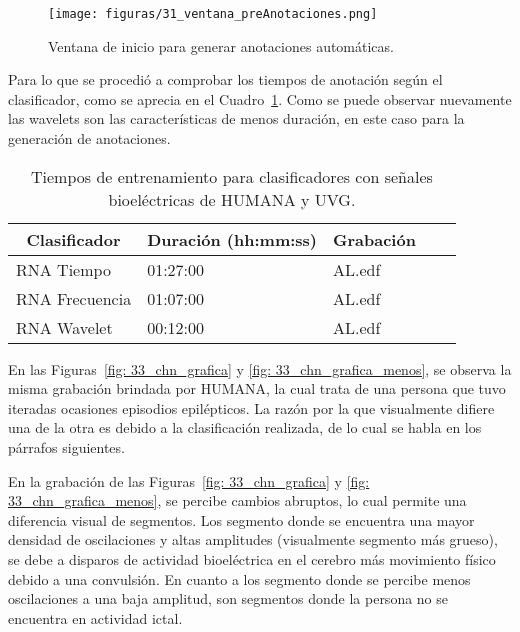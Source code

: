 \begin{figure}[H]
    \centering
    \texttt{[image: figuras/31\_ventana\_preAnotaciones.png]}
    \caption{Ventana de inicio para generar anotaciones automáticas.}
    \label{fig: pre_anotaciones_ventana}
\end{figure}

Para lo que se procedió a comprobar los tiempos de anotación según el clasificador, como se aprecia en el Cuadro~\ref{cuadro:Duracion anotaciones}. Como se puede observar nuevamente las wavelets son las características de menos duración, en este caso para la generación de anotaciones. 

\begin{table}[H]
\begin{center}
\begin{tabular}{|l|l|l|l|l|}
\hline
    \multicolumn{1}{|c|}{\textbf{Clasificador}} & \multicolumn{1}{c|}{\textbf{Duración (hh:mm:ss)}} & \multicolumn{1}{c|}{\textbf{Grabación }} \\ \hline
    RNA Tiempo   & 01:27:00  & AL.edf   \\ \hline
    RNA Frecuencia& 01:07:00  & AL.edf   \\ \hline
    RNA Wavelet   & 00:12:00  & AL.edf   \\ \hline
\end{tabular}
\caption[Tiempos de entrenamiento para clasificadores]{Tiempos de entrenamiento para clasificadores con señales bioeléctricas de HUMANA y UVG.} 
\label{cuadro:Duracion anotaciones}
\end{center}
\end{table}

En las Figuras~\ref{fig: 33_chn_grafica} y \ref{fig: 33_chn_grafica_menos}, se observa la misma grabación brindada por HUMANA, la cual trata de una persona que tuvo iteradas ocasiones episodios epilépticos. La razón por la que visualmente difiere una de la otra es debido a la clasificación realizada, de lo cual se habla en los párrafos siguientes. 

En la grabación de las Figuras~\ref{fig: 33_chn_grafica} y \ref{fig: 33_chn_grafica_menos}, se percibe cambios abruptos, lo cual permite una diferencia visual de segmentos. Los segmento donde se encuentra una mayor densidad de oscilaciones y altas amplitudes (visualmente segmento más grueso), se debe a disparos de actividad bioeléctrica en el cerebro más movimiento físico debido a una convulsión. En cuanto a los segmento donde se percibe menos oscilaciones a una baja amplitud, son segmentos donde la persona no se encuentra en actividad ictal.  

